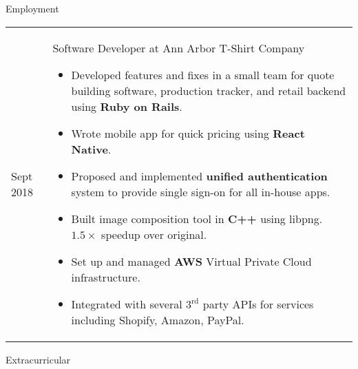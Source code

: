 \documentclass[11pt]{article}
\renewcommand{\section}[1]{{\Huge{#1}}\vspace{2 mm}}
\newenvironment{timeline}
        {\begin{tabular}{p{21 mm}|p{150 mm}}}
        {\end{tabular}}
\newenvironment{timelinetitle}
        {\vspace{-2 mm}\begin{large}}
        {\end{large}\vspace{-1.5 mm}}
\newcommand{\timespan}[2]{{#2}\newline{#1}}
\begin{document}
\vspace{3.0 mm}
\section{Employment}

\begin{timeline}
\timespan{Feb 2014}{Sept 2018}
&
\begin{timelinetitle}
    Software Developer at Ann Arbor T-Shirt Company
\end{timelinetitle}
\begin{itemize}
  \item[] Developed features and fixes in a small team for quote building software,
        production tracker, and retail backend using \textbf{Ruby on Rails}.

      \item[] Wrote mobile app for quick pricing using \textbf{React Native}.

      \item[] Proposed and implemented \textbf{unified authentication} system to provide single sign-on for all in-house apps.

      \item[] Built image composition tool in \textbf{C++} using libpng. $1.5\times$ speedup over original.

      \item[] Set up and managed \textbf{AWS} Virtual Private Cloud infrastructure.
  
      \item[] Integrated with several $3^\text{rd}$ party APIs for services including Shopify, Amazon, PayPal.

\end{itemize}

\end{timeline}

\vspace{3.0 mm}
\section{Extracurricular}
\end{document}
